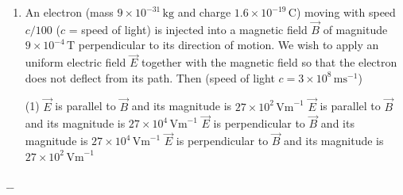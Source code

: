 \documentclass[preview, border={10mm, 5mm, 10mm, 10mm}]{standalone}
\title{\textsc{}}
\begin{document}
\begin{enumerate}[leftmargin=*]
\item[$\Omega.$] An electron (mass $9 \times 10^{-31}\,\mathrm{kg}$ and charge $1.6 \times 10^{-19}\,\mathrm{C}$) moving with speed $c/100$ ($c$ = speed of light) is injected into a magnetic field $\vec{B}$ of magnitude $9 \times 10^{-4}\,\mathrm{T}$ perpendicular to its direction of motion. We wish to apply an uniform electric field $\vec{E}$ together with the magnetic field so that the electron does not deflect from its path. Then (speed of light $c = 3 \times 10^8\,\mathrm{m s}^{-1}$)
\begin{tasks}(1)
    \task $\vec{E}$ is parallel to $\vec{B}$ and its magnitude is $27 \times 10^2\,\mathrm{V m}^{-1}$
    \task $\vec{E}$ is parallel to $\vec{B}$ and its magnitude is $27 \times 10^4\,\mathrm{V m}^{-1}$
    \task $\vec{E}$ is perpendicular to $\vec{B}$ and its magnitude is $27 \times 10^4\,\mathrm{V m}^{-1}$
    \task $\vec{E}$ is perpendicular to $\vec{B}$ and its magnitude is $27 \times 10^2\,\mathrm{V m}^{-1}$ 
\end{tasks}
\end{enumerate}
\hfill $\_\_$
\end{document}
